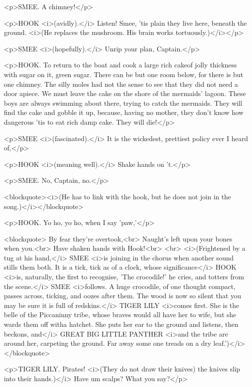 <p>SMEE. A chimney!</p>

<p>HOOK <i>(avidly).</i> Listen! Smee, 'tis plain they live here,
beneath the ground. <i>(He replaces the mushroom. His brain works
tortuously.)</i></p>

<p>SMEE <i>(hopefully).</i> Unrip your plan, Captain.</p>

<p>HOOK. To return to the boat and cook a large rich cakeof jolly
thickness with sugar on it, green sugar. There can be but one room
below, for there is but one chimney. The silly moles had not the
sense to see that they did not need a door apiece. We must leave the
cake on the shore of the mermaids' lagoon. These boys are always
swimming about there, trying to catch the mermaids. They will find
the cake and gobble it up, because, having no mother, they don't know
how dangerous 'tis to eat rich damp cake. They will die!</p>

<p>SMEE <i>(fascinated).</i> It is the wickedest, prettiest policy
ever I heard of,</p>

<p>HOOK <i>(meaning well).</i> Shake hands on 't.</p>

<p>SMEE. No, Captain, no.</p>

<blockquote><i>(He has to link with the hook, but he does not join in
the song.)</i></blockquote>

<p>HOOK. Yo ho, yo ho, when I say 'paw,'</p>

<blockquote>       By fear they're overtook,<br>
       Naught's left upon your bones when you.<br>
       Have shaken hands with Hook!<br>
<br>
 <i>(Frightened by a tug at his hand,</i> SMEE <i>is joining in the
chorus when another sound stills them both. It is a tick, tick as of
a clock, whose significance</i> HOOK <i>is, naturally, the first to
recognise, 'The crocodile!' he cries, and totters from the scene.</i>
SMEE <i>follows. A huge crocodile, of one thought compact, passes
across, ticking, and oozes after them. The wood is now so silent that
you may be sure it is full of redskins.</i> TIGER LILY <i>comes
first. She is the belle of the Piccaninny tribe, whose braves would
all have her to wife, but she wards them off witha hatchet. She puts
her ear to the ground and listens, then beckons, and</i> GREAT BIG
LITTLE PANTHER <i>and the tribe are around her, carpeting the ground.
Far away some one treads on a dry leaf.')</i></blockquote>

<p>TIGER LILY. Pirates! <i>(They do not draw their knives) the knives
slip into their hands.)</i> Have um scalps? What you say?</p>

